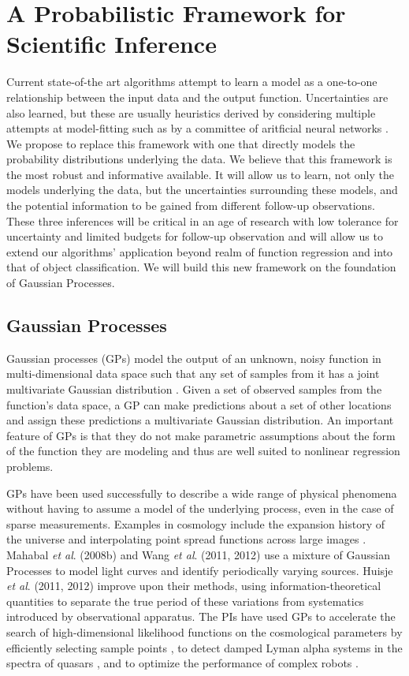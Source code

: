 \documentclass[prd,nofootbib,floatfix,11pt,tightenlines]{revtex4}
\begin{document}
\section{A Probabilistic Framework for Scientific Inference}

Current state-of-the art algorithms attempt to learn a 
model as a one-to-one
relationship between the input data and the output function. Uncertainties are
also learned, but these are usually heuristics derived by considering multiple
attempts at model-fitting such as by a committee of aritficial neural networks
\cite{annz}.  We propose to replace this framework with one that directly models
the probability distributions underlying the data.
We believe that this framework
is the most robust and informative available.  It will allow us
to learn, not only
the models underlying the data, but the uncertainties surrounding these models,
and the potential information to be gained from different follow-up
observations.  These three inferences will be critical in an age of
research with low tolerance for uncertainty and limited budgets for
follow-up observation and will allow us to extend our algorithms' application
beyond realm of function regression and into that of object classification.
We will build this new framework on the foundation of Gaussian Processes.  

\subsection{Gaussian Processes}
\label{sec:gp}


Gaussian processes (GPs) model the output of an unknown, noisy function
in multi-dimensional data space
such that any set of samples from it has a joint multivariate Gaussian
distribution \cite{gp}.  Given a set of observed samples from the function's
data space, a GP
can make predictions about a set of other locations and assign these
predictions a multivariate Gaussian distribution.  An important
feature of GPs is that they do not make parametric assumptions about the
form of the function they are modeling and thus are well suited to
nonlinear regression problems.

GPs have been used successfully to describe a wide range of physical
phenomena without having to assume a model of the underlying process, even
in the case of sparse measurements.  Examples in cosmology include the
expansion history of the universe \cite{ericgp} and interpolating point
spread functions across large images \cite{psf}.  Mahabal {\it et al}. (2008b) 
and Wang {\it et al}. (2011,
2012) use a mixture of Gaussian Processes to model light curves and
identify periodically varying sources.  Huisje {\it et al}. (2011, 2012)
improve upon their methods, using information-theoretical quantities to
separate the true period of these variations from systematics introduced by
observational apparatus.  The PIs have used GPs to accelerate the search of
high-dimensional likelihood functions on the cosmological parameters by
efficiently selecting sample points \cite{daniel2012}, to detect damped Lyman
alpha systems in the spectra of quasars \cite{Garnett12a}, and to optimize the
performance of complex robots \cite{Tesch11a,Tesch11b,Tesch13}.
\end{document}
